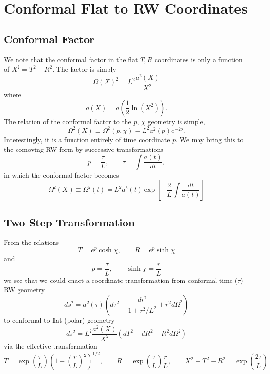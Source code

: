 \documentclass[10pt,letterpaper]{article}
\begin{document}
\section*{Conformal Flat to RW Coordinates}
\subsection*{Conformal Factor}
We note that the conformal factor in the flat $T,R$ coordinates is only a function of $X^2 = T^2-R^2$. The factor is simply
\begin{equation}
\Omega(X)^2 = L^2\frac{a^2(X)}{X^2}
\end{equation}
where 
\begin{equation}
a(X)=a\left(\frac12 \ln(X^2)\right).
\end{equation}
The relation of the conformal factor to the $p$, $\chi$ geometry is simple,
\begin{equation}
\Omega^2(X) \equiv \Omega^2(p,\chi) = L^2 a^2(p)e^{-2p}.
\end{equation}
Interestingly, it is a function entirely of time coordinate $p$. 
We may bring this to the comoving RW form by successive transformations
\begin{equation}
p = \frac{\tau}{L},\qquad \tau = \int \frac{a(t)}{dt},
\end{equation}
in which the conformal factor becomes
\begin{equation}
\Omega^2(X) \equiv \Omega^2(t) = L^2 a^2(t) \exp\left[{-\frac{2}{L}\int\frac{dt}{a(t)}}\right]
\end{equation}
\subsection*{Two Step Transformation}
From the relations
\begin{equation}
T = e^{p}\cosh \chi,\qquad R = e^{p}\sinh \chi
\end{equation}
and
\begin{equation}
p = \frac{\tau}{L},\qquad \sinh \chi = \frac{r}{L}
\end{equation}
we see that we could enact a coordinate transformation from conformal time ($\tau$) RW geometry
\begin{equation}
ds^2 = a^2(\tau) \left ( d\tau^2 - \frac{dr^2}{1+r^2/L^2} + r^2 d\Omega^2 \right)
\end{equation}
to conformal to flat (polar) geometry
\begin{equation}
ds^2 = L^2\frac{a^2(X)}{X^2} \left( dT^2 - dR^2 - R^2 d\Omega^2\right)
\end{equation}
via the effective transformation
\begin{equation}
T = \exp\left(\frac{\tau}{L}\right)\left( 1+ \left(\frac{r}{L}\right)^2\right)^{1/2},\qquad R = \exp\left(\frac{\tau}{L}\right)\frac{r}{L},\qquad X^2 \equiv T^2-R^2 = \exp\left(\frac{2\tau}{L}\right)
\end{equation}
\end{document}
